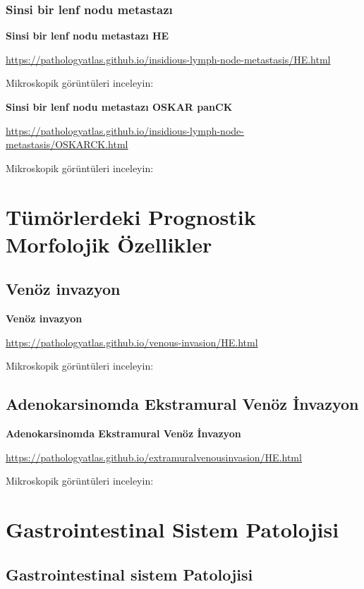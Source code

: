\documentclass[
  letterpaper,
  DIV=11,
  numbers=noendperiod]{scrreprt}
\begin{document}
\hypertarget{sinsi-bir-lenf-nodu-metastazux131}{%
\section{Sinsi bir lenf nodu
metastazı}\label{sinsi-bir-lenf-nodu-metastazux131}}

\textbf{Sinsi bir lenf nodu metastazı HE}

\url{https://pathologyatlas.github.io/insidious-lymph-node-metastasis/HE.html}

Mikroskopik görüntüleri inceleyin:

\textbf{Sinsi bir lenf nodu metastazı OSKAR panCK}

\url{https://pathologyatlas.github.io/insidious-lymph-node-metastasis/OSKARCK.html}

Mikroskopik görüntüleri inceleyin:

\part{Tümörlerdeki Prognostik Morfolojik Özellikler}

\hypertarget{venuxf6z-invazyon}{%
\chapter{Venöz invazyon}\label{venuxf6z-invazyon}}

\textbf{Venöz invazyon}

\url{https://pathologyatlas.github.io/venous-invasion/HE.html}

Mikroskopik görüntüleri inceleyin:

\hypertarget{adenokarsinomda-ekstramural-venuxf6z-invazyon}{%
\chapter{Adenokarsinomda Ekstramural Venöz
İnvazyon}\label{adenokarsinomda-ekstramural-venuxf6z-invazyon}}

\textbf{Adenokarsinomda Ekstramural Venöz İnvazyon}

\url{https://pathologyatlas.github.io/extramuralvenousinvasion/HE.html}

Mikroskopik görüntüleri inceleyin:

\part{Gastrointestinal Sistem Patolojisi}

\hypertarget{gastrointestinal-sistem-patolojisi-1}{%
\chapter{Gastrointestinal sistem
Patolojisi}\label{gastrointestinal-sistem-patolojisi-1}}
\end{document}
